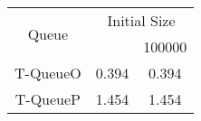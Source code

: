 \begin{tabular}{|c|c|c|}
\hline
\multirow{2}{*}{Queue} & \multicolumn{2}{c|}{Initial Size}\\\cline{2-3}& \qquad 10000 \qquad\quad & 100000\\
\hline
\hline
T-QueueO & 0.394 & 0.394\\
T-QueueP & 1.454 & 1.454\\
\hline\end{tabular}
